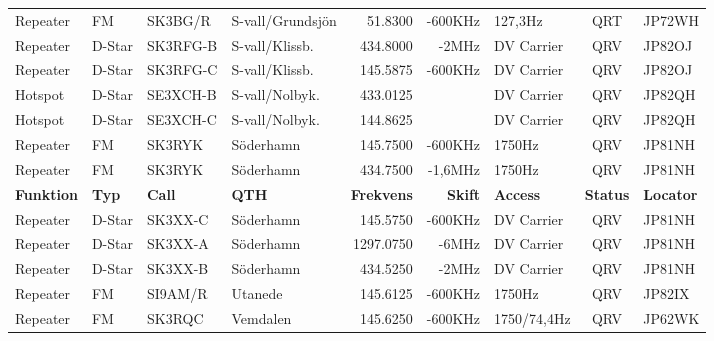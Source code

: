 \documentclass[10pt,swedish,a4paper,twoside]{article}
\begin{document}
\begin{landscape}
\begin{longtable}{llllrrlcl}
	Repeater          & FM           & SK3BG/R       & S-vall/Grundsjön &           51.8300 &        -600KHz & 127,3Hz         &       QRT       & JP72WH           \\
	Repeater          & D-Star       & SK3RFG-B      & S-vall/Klissb.   &          434.8000 &          -2MHz & DV Carrier      &       QRV       & JP82OJ           \\
	Repeater          & D-Star       & SK3RFG-C      & S-vall/Klissb.   &          145.5875 &        -600KHz & DV Carrier      &       QRV       & JP82OJ           \\
	Hotspot           & D-Star       & SE3XCH-B      & S-vall/Nolbyk.   &          433.0125 &                & DV Carrier      &       QRV       & JP82QH           \\
	Hotspot           & D-Star       & SE3XCH-C      & S-vall/Nolbyk.   &          144.8625 &                & DV Carrier      &       QRV       & JP82QH           \\
	Repeater          & FM           & SK3RYK        & Söderhamn        &          145.7500 &        -600KHz & 1750Hz          &       QRV       & JP81NH           \\
	Repeater          & FM           & SK3RYK        & Söderhamn        &          434.7500 &        -1,6MHz & 1750Hz          &       QRV       & JP81NH           \\
	\textbf{Funktion} & \textbf{Typ} & \textbf{Call} & \textbf{QTH}     & \textbf{Frekvens} & \textbf{Skift} & \textbf{Access} & \textbf{Status} & \textbf{Locator} \\ \hline
	Repeater          & D-Star       & SK3XX-C       & Söderhamn        &          145.5750 &        -600KHz & DV Carrier      &       QRV       & JP81NH           \\
	Repeater          & D-Star       & SK3XX-A       & Söderhamn        &         1297.0750 &          -6MHz & DV Carrier      &       QRV       & JP81NH           \\
	Repeater          & D-Star       & SK3XX-B       & Söderhamn        &          434.5250 &          -2MHz & DV Carrier      &       QRV       & JP81NH           \\
	Repeater          & FM           & SI9AM/R       & Utanede          &          145.6125 &        -600KHz & 1750Hz          &       QRV       & JP82IX           \\
	Repeater          & FM           & SK3RQC        & Vemdalen         &          145.6250 &        -600KHz & 1750/74,4Hz     &       QRV       & JP62WK           \\

\end{longtable}
\end{landscape}
\end{document}
